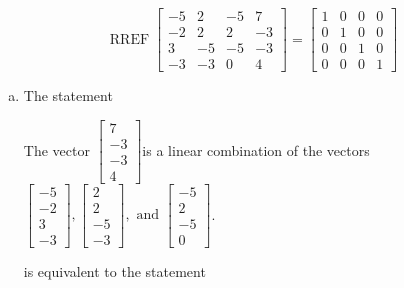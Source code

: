 \begin{exerciseAnswer} 
\[\operatorname{RREF}  \left[\begin{array}{ccc|c}
-5 & 2 & -5 & 7 \\
-2 & 2 & 2 & -3 \\
3 & -5 & -5 & -3 \\
-3 & -3 & 0 & 4
\end{array}\right] = \left[\begin{array}{ccc|c}
1 & 0 & 0 & 0 \\
0 & 1 & 0 & 0 \\
0 & 0 & 1 & 0 \\
0 & 0 & 0 & 1
\end{array}\right] \]
\begin{enumerate}[(a)]
\item  The statement 
\begin{center}\begin{minipage}{0.8\textwidth}
 The vector \( \left[\begin{array}{c}
7 \\
-3 \\
-3 \\
4
\end{array}\right] \)is a linear combination of the vectors \( \left[\begin{array}{c}
-5 \\
-2 \\
3 \\
-3
\end{array}\right] , \left[\begin{array}{c}
2 \\
2 \\
-5 \\
-3
\end{array}\right] , \text{ and } \left[\begin{array}{c}
-5 \\
2 \\
-5 \\
0
\end{array}\right] \). 
\end{minipage}\end{center}
     is equivalent to the statement 
\begin{center}\begin{minipage}{0.8\textwidth}
 The vector equation \( x_{1} \left[\begin{array}{c}
-5 \\
-2 \\
3 \\

\end{array}
\end{minipage}
\end{center}
\end{enumerate}
\end{exerciseAnswer}
